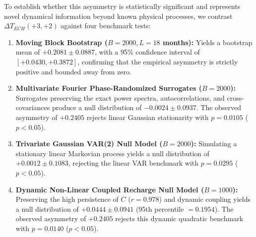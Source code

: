 \documentclass[11pt,a4paper]{article}
\begin{document}
To establish whether this asymmetry is statistically significant and represents novel dynamical information beyond known physical processes, we contrast $\Delta T_{ECH}(+3, +2)$ against four benchmark tests:
\begin{enumerate}
    \item \textbf{Moving Block Bootstrap ($B = 2000, L = 18$ months):} Yields a bootstrap mean of $+0.2081 \pm 0.0887$, with a 95\% confidence interval of $[+0.0430, +0.3872]$, confirming that the empirical asymmetry is strictly positive and bounded away from zero.
    \item \textbf{Multivariate Fourier Phase-Randomized Surrogates ($B = 2000$):} Surrogates preserving the exact power spectra, autocorrelations, and cross-covariances produce a null distribution of $-0.0024 \pm 0.0937$. The observed asymmetry of $+0.2405$ rejects linear Gaussian stationarity with \textbf{$p = 0.0105$} ($p < 0.05$).
    \item \textbf{Trivariate Gaussian VAR(2) Null Model ($B = 2000$):} Simulating a stationary linear Markovian process yields a null distribution of $+0.0012 \pm 0.1083$, rejecting the linear VAR benchmark with \textbf{$p = 0.0295$} ($p < 0.05$).
    \item \textbf{Dynamic Non-Linear Coupled Recharge Null Model ($B = 1000$):} Preserving the high persistence of $C$ ($r = 0.978$) and dynamic coupling yields a null distribution of $+0.0444 \pm 0.0941$ (95th percentile $= 0.1954$). The observed asymmetry of $+0.2405$ rejects this dynamic quadratic benchmark with \textbf{$p = 0.0140$} ($p < 0.05$).
\end{enumerate}
\end{document}
